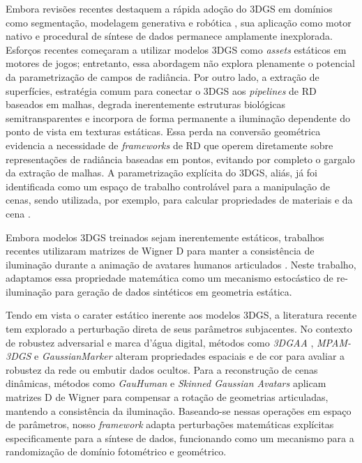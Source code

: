 \documentclass[a4paper,12pt]{article}
\begin{document}
{Embora revisões recentes destaquem a rápida adoção do 3DGS em domínios como segmentação, modelagem generativa e robótica \cite{he2026survey, chen2026survey}, sua aplicação como motor nativo e procedural de síntese de dados permanece amplamente inexplorada. Esforços recentes \cite{deogan2025synthetic, ushiroji2026automatic} começaram a utilizar modelos 3DGS como \emph{assets} estáticos em motores de jogos; entretanto, essa abordagem não explora plenamente o potencial da parametrização de campos de radiância. Por outro lado, a extração de superfícies, estratégia comum para conectar o 3DGS aos \emph{pipelines} de RD baseados em malhas, degrada inerentemente estruturas biológicas semitransparentes e incorpora de forma permanente a iluminação dependente do ponto de vista em texturas estáticas. Essa perda na conversão geométrica evidencia a necessidade de \emph{frameworks} de RD que operem diretamente sobre representações de radiância baseadas em pontos, evitando por completo o gargalo da extração de malhas. A parametrização explícita do 3DGS, aliás, já foi identificada como um espaço de trabalho controlável para a manipulação de cenas, sendo utilizada, por exemplo, para calcular propriedades de materiais e da cena \cite{liang2024gsir, Gao2025Relightable}.

Embora modelos 3DGS treinados sejam inerentemente estáticos, trabalhos recentes utilizaram matrizes de Wigner D para manter a consistência de iluminação durante a animação de avatares humanos articulados \cite{hu2024gauhuman, gkitsas2024skinning}. Neste trabalho, adaptamos essa propriedade matemática como um mecanismo estocástico de re-iluminação para geração de dados sintéticos em geometria estática.

Tendo em vista o carater estático inerente aos modelos 3DGS, a literatura recente tem explorado a perturbação direta de seus parâmetros subjacentes. No contexto de robustez adversarial e marca d'água digital, métodos como \textit{3DGAA} \cite{wang20243dgaa}, \textit{MPAM-3DGS} \cite{jiang2024mpam} e \textit{GaussianMarker} \cite{huang2024gaussianmarker} alteram propriedades espaciais e de cor para avaliar a robustez da rede ou embutir dados ocultos. Para a reconstrução de cenas dinâmicas, métodos como \textit{GauHuman} \cite{hu2024gauhuman} e \textit{Skinned Gaussian Avatars} \cite{gkitsas2024skinning} aplicam matrizes D de Wigner para compensar a rotação de geometrias articuladas, mantendo a consistência da iluminação. Baseando-se nessas operações em espaço de parâmetros, nosso \textit{framework} adapta perturbações matemáticas explícitas especificamente para a síntese de dados, funcionando como um mecanismo para a randomização de domínio fotométrico e geométrico.

}
\end{document}
